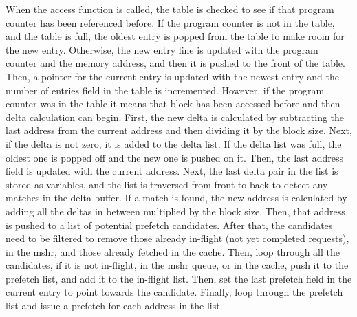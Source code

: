 When the access function is called, the table is checked to see if that program counter has been referenced before. If the program counter is not in the table, and the table is full, the oldest entry is popped from the table to make room for the new entry. Otherwise, the new entry line is updated with the program counter and the memory address, and then it is pushed to the front of the table. Then, a pointer for the current entry is updated with the newest entry and the number of entries field in the table is incremented.
However, if the program counter was in the table it means that block has been accessed before and then delta calculation can begin. First, the new delta is calculated by subtracting the last address from the current address and then dividing it by the block size. Next, if the delta is not zero, it is added to the delta list. If the delta list was full, the oldest one is popped off and the new one is pushed on it. Then, the last address field is updated with the current address. Next, the last delta pair in the list is stored as variables, and the list is traversed from front to back to detect any matches in the delta buffer. If a match is found, the new address is calculated by adding all the deltas in between multiplied by the block size. Then, that address is pushed to a list of potential prefetch candidates. After that, the candidates need to be filtered to remove those already in-flight (not yet completed requests), in the mshr, and those already fetched in the cache. Then, loop through all the candidates, if it is not in-flight, in the mshr queue, or in the cache, push it to the prefetch list, and add it to the in-flight list. Then, set the last prefetch field in the current entry to point towards the candidate. Finally, loop through the prefetch list and issue a prefetch for each address in the list.
